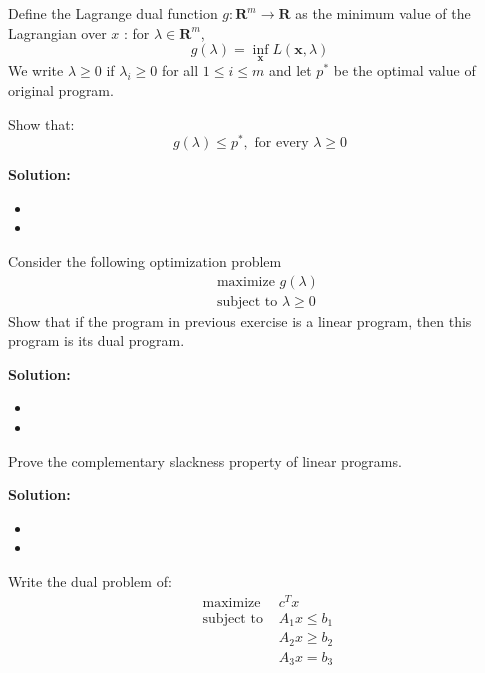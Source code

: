 \documentclass{article}
\newcounter{exercise}
\newcommand{\<}{
    \langle}
\renewcommand{\>}{
    \rangle}
\begin{document}
{\begin{exercise}
	Define the Lagrange dual function $g: \mathbf{R}^{m} \rightarrow \mathbf{R}$ as the minimum value of the Lagrangian over $x$ :
	for $\lambda \in \mathbf{R}^{m}$,
	$$
	g(\lambda)=\inf _{\mathbf{x}} L(\mathbf{x}, \lambda)
	$$
	We write $\lambda \geq 0$ if $\lambda_{i} \geq 0$ for all $1 \leq i \leq m$ and let $p^{*}$ be the optimal value of original program.
	
	Show that:
	$$
	g(\lambda) \leq p^{*} , \text{ for every } \lambda \geq 0
	$$
\end{exercise}
\textbf{Solution:}
\begin{itemize}
    \item 
    \item 
\end{itemize}
\newpage



	
\begin{exercise}
	Consider the following optimization problem
	$$\begin{aligned}
	&\text { maximize } g(\lambda)\\
	&\text { subject to } \lambda \ge 0
	\end{aligned}$$
	Show that if the program in previous exercise is a linear program, then this program is its dual program.
\end{exercise}

\textbf{Solution:}
\begin{itemize}
    \item 
    \item 
\end{itemize}
\newpage




\begin{exercise}
	Prove the complementary slackness property of linear programs.
\end{exercise}

\textbf{Solution:}
\begin{itemize}
    \item 
    \item 
\end{itemize}
\newpage




\begin{exercise}
	Write the dual problem of:
	$$\begin{aligned}
	&\text { maximize } & c^Tx\\
	&\text { subject to } & A_1x\le b_1 \\
	& &A_2x \ge b_2 \\
	& &A_3x = b_3
	\end{aligned}$$
\end{exercise}

}
\end{document}
